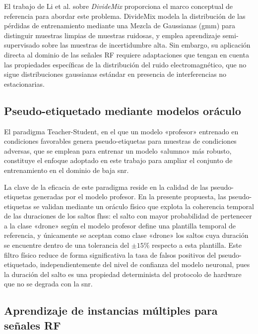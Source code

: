 El trabajo de Li et al. \cite{li_dividemix_2020} sobre \textit{DivideMix} proporciona
el marco conceptual de referencia para abordar este problema. DivideMix modela la
distribución de las pérdidas de entrenamiento mediante una Mezcla de Gaussianas
(\gls{gmm}) \cite{najar_comparison_2017} para distinguir muestras limpias de muestras
ruidosas, y emplea aprendizaje semi-supervisado sobre las muestras de incertidumbre
alta. Sin embargo, su aplicación directa al dominio de las señales RF requiere
adaptaciones que tengan en cuenta las propiedades específicas de la distribución
del ruido electromagnético, que no sigue distribuciones gaussianas estándar en
presencia de interferencias no estacionarias.

\subsection{Pseudo-etiquetado mediante modelos oráculo}
\label{subsec:pseudo_etiquetado}

El paradigma Teacher-Student, en el que un modelo «profesor» entrenado en
condiciones favorables genera pseudo-etiquetas para muestras de condiciones
adversas, que se emplean para entrenar un modelo «alumno» más robusto, constituye
el enfoque adoptado en este trabajo para ampliar el conjunto de entrenamiento en
el dominio de baja \gls{snr}.

La clave de la eficacia de este paradigma reside en la calidad de las
pseudo-etiquetas generadas por el modelo profesor. En la presente propuesta,
las pseudo-etiquetas se validan mediante un oráculo físico que explota la
coherencia temporal de las duraciones de los saltos \gls{fhss}: el salto con mayor
probabilidad de pertenecer a la clase «drone» según el modelo profesor define una
plantilla temporal de referencia, y únicamente se aceptan como clase «drone» los
saltos cuya duración se encuentre dentro de una tolerancia del $\pm 15\%$
respecto a esta plantilla. Este filtro físico reduce de forma significativa la tasa
de falsos positivos del pseudo-etiquetado, independientemente del nivel de confianza
del modelo neuronal, pues la duración del salto es una propiedad determinista del
protocolo de hardware que no se degrada con la \gls{snr}.

\subsection{Aprendizaje de instancias múltiples para señales RF}
\label{subsec:mil}

